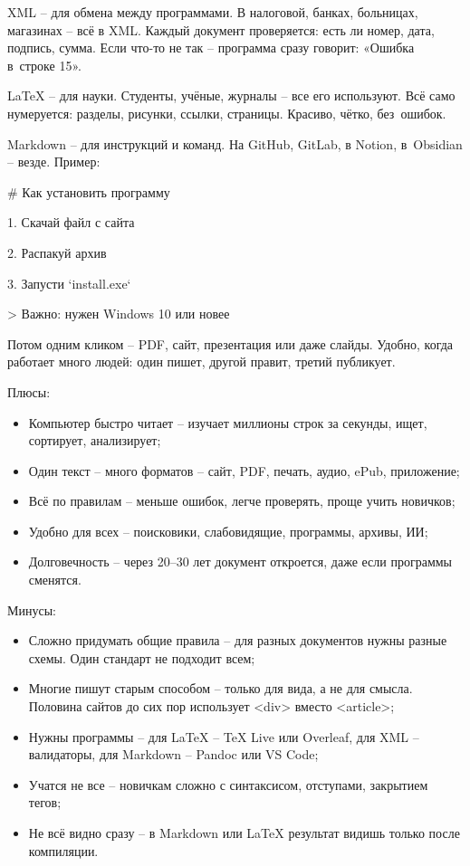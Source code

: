 \documentclass{ou}
\begin{document}
XML -- для обмена между программами. В налоговой, банках, больницах, магазинах -- всё в XML. Каждый документ проверяется: есть ли номер, дата, подпись, сумма. Если что-то не так -- программа сразу говорит: «Ошибка в~строке 15».

LaTeX -- для науки. Студенты, учёные, журналы -- все его используют. Всё само нумеруется: разделы, рисунки, ссылки, страницы. Красиво, чётко, без~ошибок.

Markdown -- для инструкций и команд. На GitHub, GitLab, в Notion, в~Obsidian -- везде. Пример:

\# Как установить программу

1. Скачай файл с сайта

2. Распакуй архив

3. Запусти `install.exe`

> Важно: нужен Windows 10 или новее

Потом одним кликом -- PDF, сайт, презентация или даже слайды. Удобно, когда работает много людей: один пишет, другой правит, третий публикует.

Плюсы:
\begin{itemize}[label=-, leftmargin=0em, itemindent=3.35em, nosep]
\item Компьютер быстро читает -- изучает миллионы строк за секунды, ищет, сортирует, анализирует;
\item Один текст -- много форматов -- сайт, PDF, печать, аудио, ePub, приложение;
\item Всё по правилам -- меньше ошибок, легче проверять, проще учить новичков;
\item Удобно для всех -- поисковики, слабовидящие, программы, архивы, ИИ;
\item Долговечность -- через 20--30 лет документ откроется, даже если программы сменятся.
\end{itemize}

Минусы:
\begin{itemize}[label=-, leftmargin=0em, itemindent=3.35em, nosep]
\item Сложно придумать общие правила -- для разных документов нужны разные схемы. Один стандарт не подходит всем;
\item Многие пишут старым способом -- только для вида, а не для смысла. Половина сайтов до сих пор использует <div> вместо <article>;
\item Нужны программы -- для LaTeX -- TeX Live или Overleaf, для XML -- валидаторы, для Markdown -- Pandoc или VS Code;
\item Учатся не все -- новичкам сложно с синтаксисом, отступами, закрытием тегов;
\item Не всё видно сразу -- в Markdown или LaTeX результат видишь только после компиляции.
\end{itemize}
\end{document}
